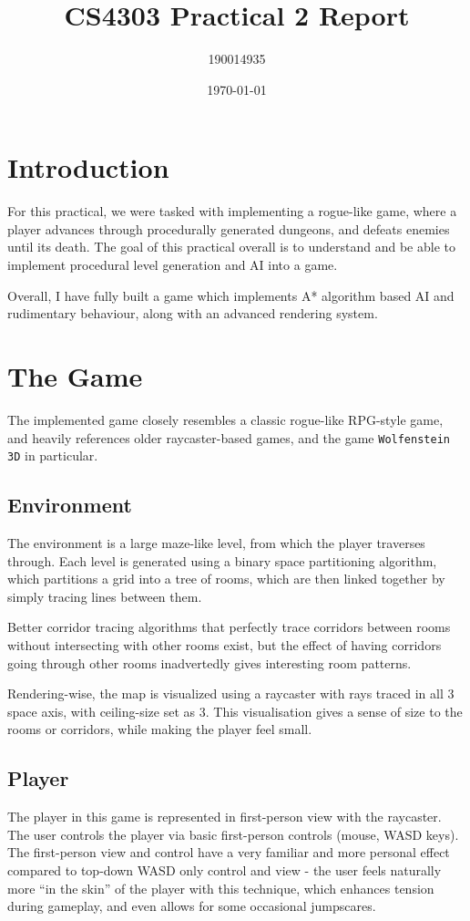 \documentclass[11pt]{article}
\author{190014935}
\date{\today}
\title{CS4303 Practical 2 Report}
\begin{document}
\maketitle
\tableofcontents


\section{Introduction}
\label{sec:org3934cb5}
For this practical, we were tasked with implementing a rogue-like game, where a player advances through procedurally
generated dungeons, and defeats enemies until its death. The goal of this practical overall is to understand and be
able to implement procedural level generation and AI into a game.

Overall, I have fully built a game which implements A* algorithm based AI and rudimentary behaviour, along with an
advanced rendering system.

\section{The Game}
\label{sec:orgd6d7351}
The implemented game closely resembles a classic rogue-like RPG-style game, and heavily references older raycaster-based
games, and the game \texttt{Wolfenstein 3D} in particular.

\subsection{Environment}
\label{sec:org01429bd}
The environment is a large maze-like level, from which the player traverses through. Each level is generated using
a binary space partitioning algorithm, which partitions a grid into a tree of rooms, which are then linked together
by simply tracing lines between them.

Better corridor tracing algorithms that perfectly trace corridors between rooms without intersecting with other rooms exist,
but the effect of having corridors going through other rooms inadvertedly gives interesting room patterns.

Rendering-wise, the map is visualized using a raycaster with rays traced in all 3 space axis,
with ceiling-size set as 3. This visualisation gives a sense of size to the rooms or corridors,
while making the player feel small.

\subsection{Player}
\label{sec:org073e6e0}
The player in this game is represented in first-person view with the raycaster. The user controls the player via basic
first-person controls (mouse, WASD keys). The first-person view and control have a very familiar and more personal effect
compared to top-down WASD only control and view - the user feels naturally more ``in the skin'' of the player with this
technique, which enhances tension during gameplay, and even allows for some occasional jumpscares.
\end{document}
